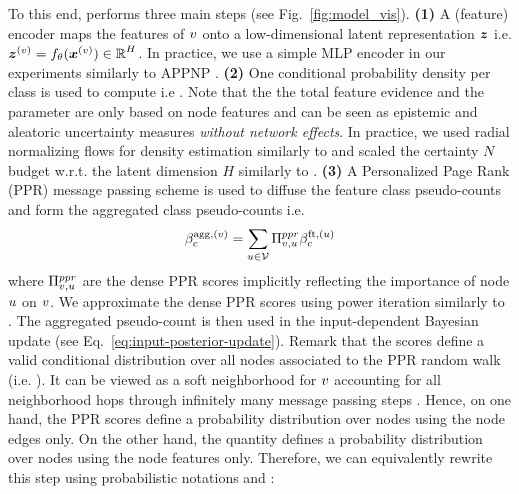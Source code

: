 To this end, \GPNacro{} performs three main steps (see Fig.~\ref{fig:model_vis}). \textbf{(1)} A (feature) encoder maps the features of $v$ onto a low-dimensional latent representation $\bm{z}$ i.e. $\bm{z}^{(v)} = f_\theta(\bm{x}^{(v)}) \in \operatorname{\mathbb{R}}^H$. In practice, we use a simple MLP encoder in our experiments similarly to APPNP \citep{Klicpera2018}. \textbf{(2)} One conditional probability density per class \smash{$\prob(\z^{(\nodev)} \condition \iclass; \vphi)$} is used to compute  i.e . Note that the the total feature evidence  and the parameter  are only based on node features and can be seen as epistemic and aleatoric uncertainty measures \emph{without network effects}. In practice, we used radial normalizing flows for density estimation similarly to \citep{charpentier2020} and scaled the certainty $N$ budget w.r.t. the latent dimension $H$ similarly to \citep{NatPN2021}. \textbf{(3)} A Personalized Page Rank (PPR) message passing scheme is used to diffuse the feature class pseudo-counts  and form the aggregated class pseudo-counts  i.e.
\begin{equation}\label{eq:agg-evidence}
    \beta_c^{\text{agg}, (v)} = \sum_{u \in \mathcal{V}} \Pi^{ppr}_{v, u} \beta_c^{\text{ft}, (u)}
\end{equation}
where $\Pi^{ppr}_{v, u}$ are the dense PPR scores implicitly reflecting the importance of node $u$ on $v$. We approximate the dense PPR scores using power iteration similarly to \citep{Klicpera2018}. The aggregated pseudo-count  is then used in the input-dependent Bayesian update (see Eq.~\ref{eq:input-posterior-update}). Remark that the scores  define a valid conditional distribution over all nodes associated to the PPR random walk (i.e. ). It can be viewed as a soft neighborhood for $v$ accounting for all neighborhood hops through infinitely many message passing steps \citep{Klicpera2018}. Hence, on one hand, the PPR scores define a probability distribution over nodes using the node edges only. On the other hand, the quantity \smash{$\prob(\z^{(\nodeu)} \condition \iclass; \vphi)$} defines a probability distribution over nodes using the node features only. Therefore, we can equivalently rewrite this step using probabilistic notations  and \smash{$\prob(\nodeu \condition \iclass) = \prob(\z^{(\nodeu)} \condition \iclass; \vphi)$}:
